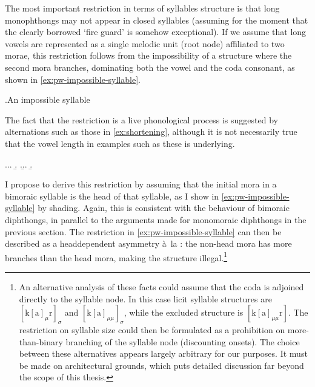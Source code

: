 The most important restriction in terms of syllables structure is that long monophthongs may not appear in closed syllables (assuming for the moment that the clearly borrowed \ipa{[ˈɡaːrd]} `fire guard' is somehow exceptional). If we assume that long vowels are represented as a single melodic unit (root node) affiliated to two morae, this restriction follows from the impossibility of a structure where the second mora branches, dominating both the vowel and the coda consonant, as shown in \ref{ex:pw-impossible-syllable}.

\ex.\label{ex:pw-impossible-syllable}An impossible syllable\\

The fact that the restriction is a live phonological process is suggested by alternations such as those in \cref{ex:shortening}, although it is not necessarily true that the vowel length in examples such as these is underlying.

\ex.\label{ex:shortening}\a.\a.
\b.
\z.\b.\a.
\b.

I propose to derive this restriction by assuming that the initial mora in a bimoraic syllable is the head of that syllable, as I show in \ref{ex:pw-impossible-syllable} by shading. Again, this is consistent with the behaviour of bimoraic diphthongs, in parallel to the arguments made for monomoraic diphthongs in the previous section. The restriction in \cref{ex:pw-impossible-syllable} can then be described as a head\endash dependent asymmetry à~la \citet{dresher-vdhulst,mellander04:_hl,rice07}: the non-head mora has more branches than the head mora, making the structure illegal.\footnote{\label{fn:pw-syll-adjunction-analysis}An alternative analysis of these facts could assume that the coda is adjoined directly to the syllable node. In this case licit syllable structures are $[\mbox{k}[\mbox{a}]_{\mu}\mbox{r}]_{\sigma}$ and $[\mbox{k}[\mbox{a}]_{\mu\mu}]_{\sigma}$, while the excluded structure is $[\mbox{k}[\mbox{a}]_{\mu\mu}\mbox{r}]$. The restriction on syllable size could then be formulated as a prohibition on more\hyp than\hyp binary branching of the syllable node (discounting onsets). The choice between these alternatives appears largely arbitrary for our purposes. It must be made on architectural grounds, which puts detailed discussion far beyond the scope of this thesis.}

